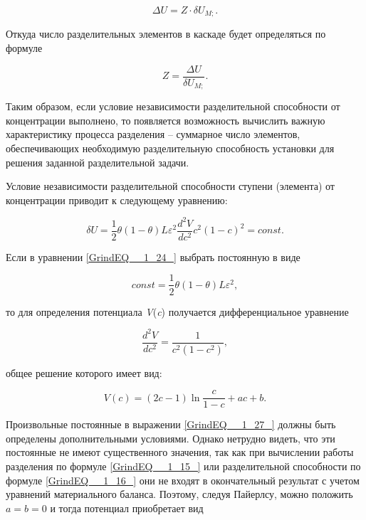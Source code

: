 \begin{equation} \label{GrindEQ__1_22_} 
\Delta U=Z\cdot \delta U_{M;} .       
\end{equation} 

Откуда число разделительных элементов в каскаде будет определяться по формуле

\begin{equation} \label{GrindEQ__1_23_} 
Z=\frac{\Delta U}{\delta U_{M;} }  .        
\end{equation} 

Таким образом, если условие независимости разделительной способности от концентрации выполнено, то появляется возможность вычислить важную характеристику процесса разделения -- суммарное число элементов, обеспечивающих необходимую разделительную способность установки для решения заданной разделительной задачи.

Условие независимости разделительной способности ступени (элемента) от концентрации приводит к следующему уравнению:

\begin{equation} \label{GrindEQ__1_24_} 
\delta U=\frac{1}{2} \theta (1-\theta )L\varepsilon ^{2} \frac{d^{2} V}{dc^{2} } c^{2} (1-c)^{2} =const.   
\end{equation} 

Если в уравнении \ref{GrindEQ__1_24_} выбрать постоянную в виде

\begin{equation} \label{GrindEQ__1_25_} 
const=\frac{1}{2} \theta (1-\theta )L\varepsilon ^{2} ,     
\end{equation}

то для определения потенциала \textit{V}(\textit{c}) получается дифференциальное уравнение

\begin{equation} \label{GrindEQ__1_26_} 
\frac{d^{2} V}{dc^{2} } =\frac{1}{c^{2} (1-c^{2} )} ,      
\end{equation}

общее решение которого имеет вид:

\begin{equation} \label{GrindEQ__1_27_} 
V(c)=(2c-1)\ln \frac{c}{1-c} +ac+b.    
\end{equation} 

Произвольные постоянные в выражении \ref{GrindEQ__1_27_} должны быть определены дополнительными условиями. Однако нетрудно видеть, что эти постоянные не имеют существенного значения, так как при вычислении работы разделения по формуле \ref{GrindEQ__1_15_} или разделительной способности по формуле \ref{GrindEQ__1_16_} они не входят в окончательный результат с учетом уравнений материального баланса. Поэтому, следуя Пайерлсу, можно положить $a=b=0$ и тогда потенциал приобретает вид

